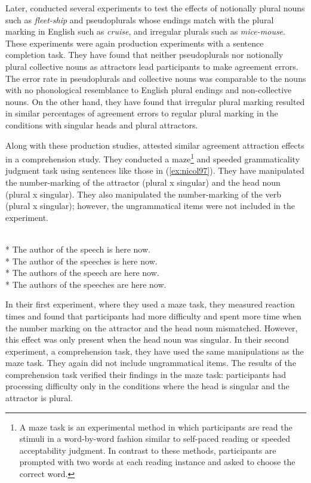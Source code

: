 Later,  conducted several experiments to test the effects of notionally plural nouns such as \emph{fleet-ship} and pseudoplurals whose endings match with the plural marking in English such as \emph{cruise}, and irregular plurals such as \emph{mice-mouse}. These experiments were again production experiments with a sentence completion task. They have found that neither pseudoplurals nor notionally plural collective nouns as attractors lead participants to make agreement errors. The error rate in pseudoplurals and collective nouns was comparable to the nouns with no phonological resemblance to English plural endings and non-collective nouns. On the other hand, they have found that irregular plural marking resulted in similar percentages of agreement errors to regular plural marking in the conditions with singular heads and plural attractors.

Along with these production studies,  attested similar agreement attraction effects in a comprehension study. They conducted a maze\footnote{A maze task is an experimental method in which participants are read the stimuli in a word-by-word fashion similar to self-paced reading or speeded acceptability judgment. In contrast to these methods, participants are prompted with two words at each reading instance and asked to choose the correct word.} and speeded grammaticality judgment task using sentences like those in (\ref{ex:nicol97}). They have manipulated the number-marking of the attractor (plural x singular) and the head noun (plural x singular). They also manipulated the number-marking of the verb (plural x singular); however, the ungrammatical items were not included in the experiment. 

\ea \label{ex:nicol97}
   \\* The {author} of the {speech} is here now.
   \\* The {author} of the {speeches} is here now.
   \\* The {authors} of the {speech} are here now.
   \\* The {authors} of the {speeches} are here now.
  \z
\z

In their first experiment, where they used a maze task, they measured reaction times and found that participants had more difficulty and spent more time when the number marking on the attractor and the head noun mismatched. However, this effect was only present when the head noun was singular. In their second experiment, a comprehension task, they have used the same manipulations as the maze task. They again did not include ungrammatical items. The results of the comprehension task verified their findings in the maze task: participants had processing difficulty only in the conditions where the head is singular and the attractor is plural. 

